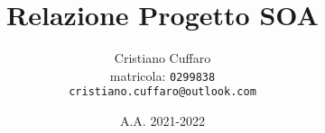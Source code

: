 \documentclass{article}
\begin{document}
\author{%
Cristiano Cuffaro \\
{\small matricola: \texttt{0299838}} \\
{\small \texttt{cristiano.cuffaro@outlook.com}}
}
\title{Relazione Progetto SOA}
\date{A.A. 2021-2022}

\maketitle
\tableofcontents
\newpage
\end{document}
